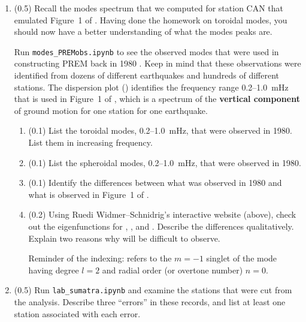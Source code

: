 \documentclass[11pt,titlepage,fleqn]{article}
\begin{document}
\begin{enumerate}
\item (0.5) Recall the modes spectrum that we computed for station CAN that emulated Figure~1 of \citet{Park2005}. Having done the homework on toroidal modes, you should now have a better understanding of what the modes peaks are.

Run \verb+modes_PREMobs.ipynb+ to see the observed modes that were used in constructing PREM back in 1980 \citep{PREM}. Keep in mind that these observations were identified from dozens of different earthquakes and hundreds of different stations.
The dispersion plot () identifies the frequency range 0.2--1.0~mHz that is used in Figure~1 of \citet{Park2005}, which is a spectrum of the {\bf vertical component} of ground motion for one station for one earthquake.
%
\begin{enumerate}
\item (0.1) List the toroidal modes, 0.2--1.0~mHz, that were observed in 1980. \\
List them in increasing frequency.
\item (0.1) List the spheroidal modes, 0.2--1.0~mHz, that were observed in 1980.
\item (0.1) Identify the differences between what was observed in 1980 and what is observed in Figure~1 of \citet{Park2005}.
\item (0.2) Using Ruedi Widmer--Schnidrig's interactive website (above), check out the eigenfunctions for , , and . Describe the differences qualitatively. Explain two reasons why  will be difficult to observe.

Reminder of the indexing:  refers to the $m=-1$ singlet of the mode having degree $l=2$ and radial order (or overtone number) $n=0$.
\end{enumerate}


\item (0.5) Run \verb+lab_sumatra.ipynb+ and examine the stations that were cut from the analysis. Describe three ``errors'' in these records, and list at least one station associated with each error.


\end{enumerate}
\end{document}
